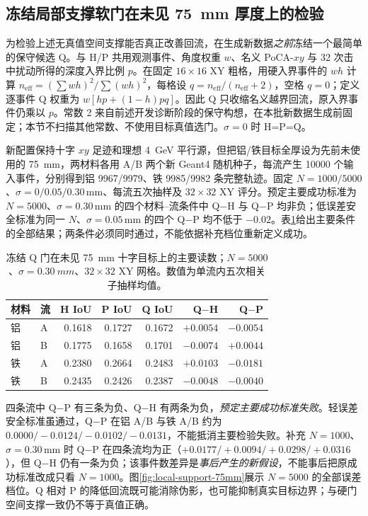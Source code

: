 \documentclass[UTF8,fontset=none,zihao=-4,a4paper]{ctexart}
\begin{document}
\subsection{冻结局部支撑软门在未见 \SI{75}{mm} 厚度上的检验}
为检验上述无真值空间支撑能否真正改善回流，在生成新数据\emph{之前}冻结一个最简单的保守候选 Q。与 H/P 共用观测事件、角度权重 $w$、名义 PoCA-$xy$ 与 32 次击中扰动所得的深度入界比例 $p$。在固定 $16\times16$ XY 粗格，用硬入界事件的 $w h$ 计算 $n_{\mathrm{eff}}=(\sum wh)^2/\sum(wh)^2$，每格设 $q=n_{\mathrm{eff}}/(n_{\mathrm{eff}}+2)$，空格 $q=0$；定义逐事件 Q 权重为 $w[hp+(1-h)pq]$。因此 Q 只收缩名义越界回流，原入界事件仍乘以 $p$。常数 2 来自前述开发诊断阶段的保守构想，在本批新数据生成前固定；本节不扫描其他常数、不使用目标真值选门。$\sigma=0$ 时 H=P=Q。

新配置保持十字 $xy$ 足迹和理想 \SI{4}{GeV} 平行源，但把铝/铁目标全厚设为先前未使用的 \SI{75}{mm}，两材料各用 A/B 两个新 Geant4 随机种子，每流产生 \num{10000} 个输入事件，分别得到铝 \num{9967}/\num{9979}、铁 \num{9985}/\num{9982} 条完整轨迹。固定 $N=1000/5000$、$\sigma=0/0.05/0.30\,\mathrm{mm}$、每流五次抽样及 $32\times32$ XY 评分。预定主要成功标准为 $N=5000$、$\sigma=0.30\,\mathrm{mm}$ 的四个材料--流条件中 Q$-$H 与 Q$-$P 均非负；低误差安全标准为同一 $N$、$\sigma=0.05\,\mathrm{mm}$ 的四个 Q$-$P 均不低于 $-0.02$。表\ref{tab:local-support-75mm}给出主要条件的全部结果；两条件必须同时通过，不能依据补充档位重新定义成功。

\begin{table}[H]
\centering
\caption{冻结 Q 门在未见 \SI{75}{mm} 十字目标上的主要读数；$N=5000$、$\sigma=\SI{0.30}{mm}$、$32\times32$ XY 网格。数值为单流内五次相关子抽样均值。}
\label{tab:local-support-75mm}
\small
\begin{tabular}{llrrrrr}
\toprule
材料 & 流 & H IoU & P IoU & Q IoU & Q$-$H & Q$-$P\\
\midrule
铝 & A & 0.1618 & 0.1727 & 0.1672 & $+0.0054$ & $-0.0054$\\
铝 & B & 0.1775 & 0.1658 & 0.1701 & $-0.0074$ & $+0.0044$\\
铁 & A & 0.2380 & 0.2664 & 0.2483 & $+0.0103$ & $-0.0181$\\
铁 & B & 0.2435 & 0.2426 & 0.2387 & $-0.0048$ & $-0.0040$\\
\bottomrule
\end{tabular}
\end{table}

四条流中 Q$-$P 有三条为负、Q$-$H 有两条为负，\emph{预定主要成功标准失败}。轻误差安全标准虽通过，Q$-$P 在铝 A/B 与铁 A/B 约为 $0.0000/-0.0124/-0.0102/-0.0131$，不能抵消主要检验失败。补充 $N=1000$、$\sigma=0.30\,\mathrm{mm}$ 时 Q$-$P 在四条流均为正（$+0.0177/+0.0094/+0.0298/+0.0316$），但 Q$-$H 仍有一条为负；该事件数差异是\emph{事后产生的新假设}，不能事后把原成功标准改成只看 $N=1000$。图\ref{fig:local-support-75mm}展示 $N=5000$ 的全部误差档位。Q 相对 P 的降低回流既可能消除伪影，也可能抑制真实目标边界；与硬门空间支撑一致仍不等于真值正确。
\end{document}
